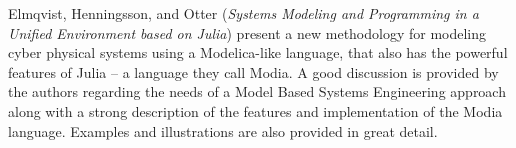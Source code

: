 


Elmqvist, Henningsson, and Otter
\cite{isola-2016-elmqvist}
({\em Systems Modeling and Programming in a
Unified Environment based on Julia})
present a new methodology for modeling cyber physical systems using a Modelica-like language, that also has the powerful features of Julia -- a language they call Modia. A good discussion is provided by the authors regarding the needs of a Model Based Systems Engineering approach along with a strong description of the features and implementation of the Modia language. Examples and illustrations are also provided in great detail.

